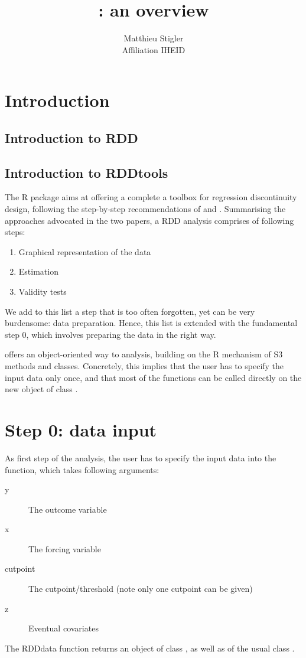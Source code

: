 \documentclass[english,nojss]{jss}\usepackage{graphicx, color}
\author{Matthieu Stigler\\Affiliation IHEID}
\title{\pkg{RDDtools}: an overview }
\begin{document}
\tableofcontents{}


\section{Introduction}



\subsection{Introduction to RDD}




\subsection{Introduction to RDDtools}

The R package  aims at offering a complete a toolbox
for regression discontinuity design, following the step-by-step recommendations
of \citet{ImbensLemieux2008} and \citet{LeeLemieux2010}. Summarising
the approaches advocated in the two papers, a RDD analysis comprises
of following steps:
\begin{enumerate}
\item Graphical representation of the data
\item Estimation 
\item Validity tests
\end{enumerate}
We add to this list a step that is too often forgotten, yet can be
very burdensome: data preparation. Hence, this list is extended with
the fundamental step 0, which involves preparing the data in the right
way. 

 offers an object-oriented way to analysis, building
on the R mechanism of S3 methods and classes. Concretely, this implies
that the user has to specify the input data only once, and that most
of the functions can be called directly on the new object of class
.


\section{Step 0: data input}


As first step of the analysis, the user has to specify the input data
into the  function, which takes following arguments:
\begin{description}
\item [{y}] The outcome variable
\item [{x}] The forcing variable 
\item [{cutpoint}] The cutpoint/threshold (note only one cutpoint can be
given)
\item [{z}] Eventual covariates
\end{description}
The RDDdata function returns an object of class , as
well as of the usual  class . 
\end{document}
